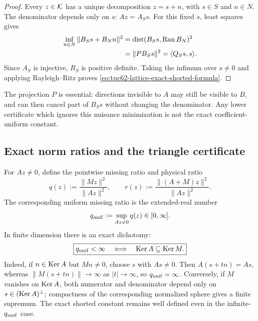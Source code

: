 \begin{proof}
Every \(z\in\mathcal K\) has a unique decomposition \(z=s+n\), with
\(s\in S\) and \(n\in N\).  The denominator depends only on \(s\):
\(Az=A_Ss\).  For this fixed \(s\), least squares gives
\begin{align*}
 \inf_{n\in N}\|B_Ss+B_Nn\|^2
 &=\operatorname{dist}(B_Ss,\operatorname{Ran} B_N)^2\\
 &=\|PB_Ss\|^2
  =\langle Q_Ss,s\rangle.
\end{align*}
Since \(A_S\) is injective, \(R_S\) is positive definite.  Taking the
infimum over \(s\ne0\) and applying Rayleigh--Ritz proves
\eqref{eq:tpc62-lattice-exact-shorted-formula}.
\end{proof}

The projection \(P\) is essential: directions invisible to \(A\) may
still be visible to \(B\), and can then cancel part of \(B_Ss\) without
changing the denominator.  Any lower certificate which ignores this
nuisance minimization is not the exact coefficient-uniform constant.

\subsection{Exact norm ratios and the triangle certificate}

For \(Az\ne0\), define the pointwise missing ratio and physical ratio
\begin{equation}
 q(z):=\frac{\|Mz\|^2}{\|Az\|^2},
 \qquad
 r(z):=\frac{\|(A+M)z\|^2}{\|Az\|^2}.
 \label{eq:tpc62-pointwise-q-r}
\end{equation}
The corresponding uniform missing ratio is the extended-real number
\begin{equation}
 q_{\rm unif}:=\sup_{Az\ne0}q(z)\in[0,\infty].
 \label{eq:tpc62-uniform-q}
\end{equation}
In finite dimension there is an exact dichotomy:
\begin{equation}
 \boxed{
 q_{\rm unif}<\infty
 \quad\Longleftrightarrow\quad
 \operatorname{Ker} A\subseteq\operatorname{Ker} M.}
 \label{eq:tpc62-q-finite-kernel-test}
\end{equation}
Indeed, if \(n\in\operatorname{Ker} A\) but \(Mn\ne0\), choose \(s\) with \(As\ne0\).
Then \(A(s+tn)=As\), whereas
\(\|M(s+tn)\|\to\infty\) as \(|t|\to\infty\), so
\(q_{\rm unif}=\infty\).  Conversely, if \(M\) vanishes on
\(\operatorname{Ker} A\), both numerator and denominator depend only on
\(s\in(\operatorname{Ker} A)^\perp\); compactness of the corresponding normalized
sphere gives a finite supremum.  The exact shorted constant remains well
defined even in the infinite-\(q_{\rm unif}\) case.

